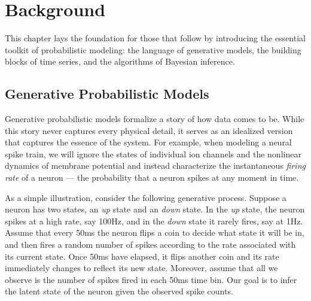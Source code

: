
\chapter{Background}
This chapter lays the foundation for those that follow by introducing 
the essential toolkit of probabilistic modeling: the language of 
generative models, the building blocks of time series, and the algorithms
of Bayesian inference. 


\section{Generative Probabilistic Models}
\label{sec:generative_models}
Generative probabilistic models formalize a story of how data comes to be. 
While this story never captures every physical detail, it serves as an 
idealized version that captures the essence of the system. For example, when
modeling a neural spike train, we will ignore the states of individual ion 
channels and the nonlinear dynamics of membrane potential and instead 
characterize the instantaneous \emph{firing rate} of a neuron --- the 
probability that a neuron spikes at any moment in time. 

As a simple illustration, consider the following generative
process. Suppose a neuron has two states, an \emph{up} state and an
\emph{down} state. In the \emph{up} state, the neuron spikes at a high
rate, say 100Hz, and in the \emph{down} state it rarely fires, say at 1Hz.
Assume that every 50ms the neuron flips a coin to decide what state it
will be in, and then fires a random number of spikes according to the
rate associated with its current state. Once 50ms have elapsed, it
flips another coin and its rate immediately changes to reflect its new
state. Moreover, assume that all we observe is the number of spikes
fired in each 50ms time bin.  Our goal is to infer the latent state of
the neuron given the observed spike counts.

